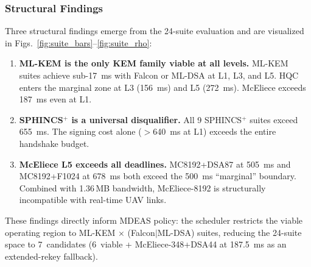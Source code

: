 \subsubsection{Structural Findings}
Three structural findings emerge from the 24-suite evaluation and are
visualized in Figs.~\ref{fig:suite_bars}--\ref{fig:suite_rho}:

\begin{enumerate}
\item \textbf{ML-KEM is the only KEM family viable at all levels.}
  ML-KEM suites achieve sub-\SI{17}{ms} with Falcon or ML-DSA at
  L1, L3, and L5.  HQC enters the marginal zone at L3
  (\SI{156}{ms}) and L5 (\SI{272}{ms}).  McEliece exceeds
  \SI{187}{ms} even at L1.

\item \textbf{SPHINCS$^+$ is a universal disqualifier.}
  All 9 SPHINCS$^+$ suites exceed \SI{655}{ms}.  The signing
  cost alone ($>$\SI{640}{ms} at L1) exceeds the entire
  handshake budget.

\item \textbf{McEliece L5 exceeds all deadlines.}
  MC8192+DSA87 at \SI{505}{ms} and MC8192+F1024 at \SI{678}{ms}
  both exceed the \SI{500}{ms} ``marginal'' boundary.  Combined with
  1.36\,MB bandwidth, McEliece-8192 is structurally incompatible with
  real-time UAV links.
\end{enumerate}

\noindent
These findings directly inform MDEAS policy: the scheduler restricts
the viable operating region to ML-KEM$\,\times\,$(Falcon$\mid$ML-DSA)
suites, reducing the 24-suite space to 7~candidates (6~viable +
McEliece-348+DSA44 at \SI{187.5}{ms} as an extended-rekey fallback).

